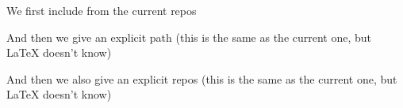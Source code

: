 \documentclass[minimal]{omdoc}
\begin{document}
We first include from the current repos

And then we give an explicit path (this is the same as  the current one, but {\LaTeX}
doesn't know)

And then we also give an explicit repos (this is the same as  the current one, but {\LaTeX}
doesn't know)

\end{document}
